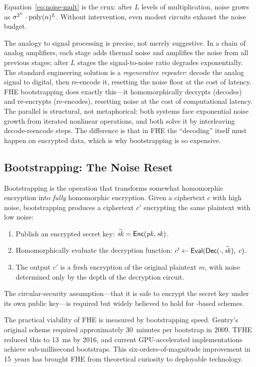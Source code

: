Equation~\eqref{eq:noise-mult} is the crux: after $L$ levels of multiplication, noise grows as $\sigma^{2^L}\cdot\operatorname{poly}(n)^L$.  Without intervention, even modest circuits exhaust the noise budget.

The analogy to signal processing is precise, not merely suggestive.  In a chain of analog amplifiers, each stage adds thermal noise and amplifies the noise from all previous stages; after $L$ stages the signal-to-noise ratio degrades exponentially.  The standard engineering solution is a \emph{regenerative repeater}: decode the analog signal to digital, then re-encode it, resetting the noise floor at the cost of latency.  FHE bootstrapping does exactly this---it homomorphically decrypts (decodes) and re-encrypts (re-encodes), resetting noise at the cost of computational latency.  The parallel is structural, not metaphorical: both systems face exponential noise growth from iterated nonlinear operations, and both solve it by interleaving decode-reencode steps.  The difference is that in FHE the ``decoding'' itself must happen on encrypted data, which is why bootstrapping is so expensive.


\subsection{Bootstrapping: The Noise Reset}
\label{subsec:bootstrapping}

Bootstrapping is the operation that transforms somewhat homomorphic encryption into \emph{fully} homomorphic encryption.  Given a ciphertext $c$ with high noise, bootstrapping produces a ciphertext $c'$ encrypting the same plaintext with low noise:

\begin{enumerate}
\item Publish an encrypted secret key: $\widetilde{\mathit{sk}} = \mathsf{Enc}(\mathit{pk}, \mathit{sk})$.
\item Homomorphically evaluate the decryption function: $c' \leftarrow \mathsf{Eval}(\mathsf{Dec}(\cdot, \widetilde{\mathit{sk}}),\; c)$.
\item The output $c'$ is a fresh encryption of the original plaintext $m$, with noise determined only by the depth of the decryption circuit.
\end{enumerate}

The circular-security assumption---that it is safe to encrypt the secret key under its own public key---is required but widely believed to hold for \lwe{}-based schemes.

\begin{example}
\label{ex:bootstrap-progress}
The practical viability of FHE is measured by bootstrapping speed.  Gentry's original scheme required approximately 30~minutes per bootstrap in 2009.  TFHE reduced this to 13~ms by 2016, and current GPU-accelerated implementations achieve sub-millisecond bootstraps.  This six-orders-of-magnitude improvement in 15~years has brought FHE from theoretical curiosity to deployable technology.
\end{example}


